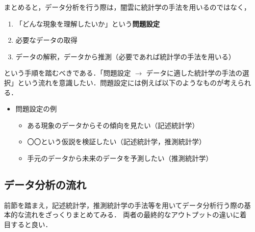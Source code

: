 まとめると，データ分析を行う際は，闇雲に統計学の手法を用いるのではなく，

\begin{enumerate}
  \item 「どんな現象を理解したいか」という\textbf{問題設定}
  \item 必要なデータの取得
  \item データの解釈，データから推測（必要であれば統計学の手法を用いる）
\end{enumerate}

という手順を踏むべきである．「問題設定 $\rightarrow$ データに適した統計学の手法の選択」という流れを意識したい．問題設定には例えば以下のようなものが考えられる．

\begin{itemize}
  \item 問題設定の例
        \begin{itemize}
          \item ある現象のデータからその傾向を見たい（記述統計学）
          \item 〇〇という仮説を検証したい（記述統計学，推測統計学）
          \item 手元のデータから未来のデータを予測したい（推測統計学）
        \end{itemize}
\end{itemize}


\newpage

\subsection{データ分析の流れ} %
\label{sub:データ分析の流れ}

前節を踏まえ，記述統計学，推測統計学の手法等を用いてデータ分析行う際の基本的な流れをざっくりまとめてみる．
両者の最終的なアウトプットの違いに着目すると良い．

\vspace{10pt}


